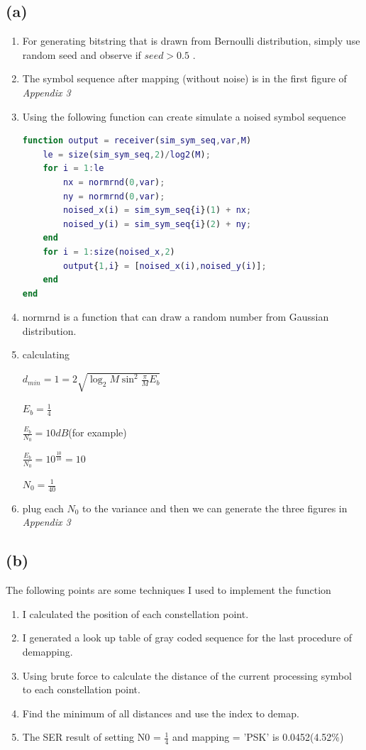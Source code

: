 \documentclass{article}
\begin{document}
\begin{CJK*}{UTF8}{bsmi}
\subsection{(a)} 
\begin{enumerate}
    \item For generating bitstring that is drawn from Bernoulli distribution, simply use random seed and observe if $seed > 0.5$ .
    \item The symbol sequence after mapping (without noise) is in the first figure of \emph{Appendix 3}
    \item Using the following function can create simulate a noised symbol sequence
    \begin{lstlisting}[language = Matlab]
%% receive noise
function output = receiver(sim_sym_seq,var,M)
    le = size(sim_sym_seq,2)/log2(M);
    for i = 1:le
        nx = normrnd(0,var);
        ny = normrnd(0,var);
        noised_x(i) = sim_sym_seq{i}(1) + nx;
        noised_y(i) = sim_sym_seq{i}(2) + ny;
    end
    for i = 1:size(noised_x,2)
        output{1,i} = [noised_x(i),noised_y(i)];    
    end
end
    \end{lstlisting}
    \item normrnd is a function that can draw a random number from Gaussian distribution.
    \item calculating
    
    $d_{min} = 1  = 2\sqrt{\log_{2}{M}\sin^2{\frac{\pi}{M}}E_b}$ 
    
    $E_b = \frac{1}{4}$ 

    $\frac{E_b}{N_0} = 10dB$(for example)

    $\frac{E_b}{N_0}  = 10^{\frac{10}{10}} = 10$

    $N_0 = \frac{1}{40}$
    \item plug each $N_0$ to the variance and then we can generate the three figures in \emph{Appendix 3}
    
\end{enumerate}

\subsection{(b)}
\quad The following points are some techniques I used to implement the function
\begin{enumerate}
    \item I calculated the position of each constellation point.
    \item I generated a look up table of gray coded sequence for the last procedure of demapping.
    \item Using brute force to calculate the distance of the current processing symbol to each constellation point.
    \item Find the minimum of all distances and use the index to demap.
    \item The SER result of setting N0 = $\frac{1}{4}$ and mapping = 'PSK' is 0.0452(4.52\%) 
\end{enumerate}




\end{CJK*}
\end{document}
